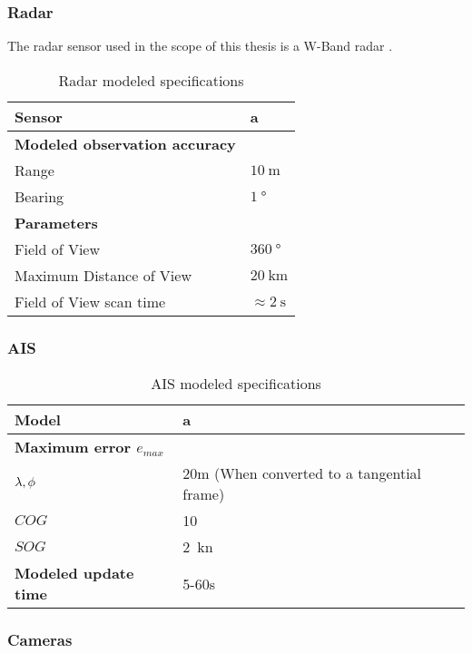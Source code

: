 \subsubsection{Radar}
The radar sensor used in the scope of this thesis is a W-Band radar . 


\begin{table}[]
	\centering
	\caption{Radar modeled specifications}
	\label{tab:radar_specs}
	\begin{tabular}{ll}
		\hline
		\textbf{Sensor} & a \\ \hline
		\textbf{Modeled observation accuracy} &  \\
		Range & $\SI{10}{\m}$ \\
		Bearing & $\SI{1}{\degree}$ \\ \hline
		\textbf{Parameters} &  \\
		Field of View & $\SI{360}{\degree}$ \\
		Maximum Distance of View & $\SI{20}{\km}$ \\
		Field of View scan time & $\approx \SI{2}{\second}$ \\ \hline
	\end{tabular}
\end{table}
\subsubsection{AIS}

\begin{table}[H]
	\centering
	\caption{AIS modeled specifications}
	\label{tab:AIS_specs}
	\begin{tabular}{ll}
		\hline
		\textbf{Model} & a \\ \hline
		\textbf{Maximum error $e_{max}$} &  \\
		${{\lambda} ,{\phi}}$ & 20m (When converted to a tangential frame) \\
		${COG}$ & \SI{10}{\deg} \\
		${SOG}$ & \SI{2}{\knot} \\ \hline
		\textbf{Modeled update time} & 5-60s \\ \hline
	\end{tabular}
\end{table}

\subsubsection{Cameras}

